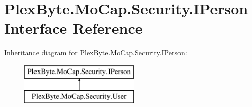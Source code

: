 \hypertarget{interface_plex_byte_1_1_mo_cap_1_1_security_1_1_i_person}{}\section{Plex\+Byte.\+Mo\+Cap.\+Security.\+I\+Person Interface Reference}
\label{interface_plex_byte_1_1_mo_cap_1_1_security_1_1_i_person}
Inheritance diagram for Plex\+Byte.\+Mo\+Cap.\+Security.\+I\+Person\+:\begin{figure}[H]
\begin{center}
\leavevmode
\includegraphics[height=2.000000cm]{interface_plex_byte_1_1_mo_cap_1_1_security_1_1_i_person}
\end{center}
\end{figure}
